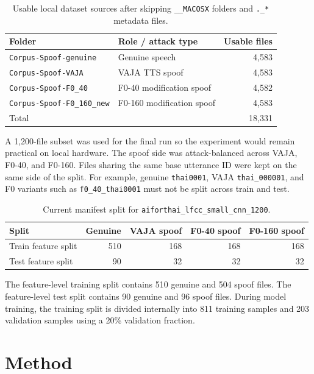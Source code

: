 \documentclass[11pt,a4paper]{article}
\begin{document}
\begin{table}[h]
\centering
\caption{Usable local dataset sources after skipping \texttt{\_\_MACOSX} folders and \texttt{.\_*} metadata files.}
\label{tab:dataset-sources}
\begin{tabular}{llr}
\toprule
Folder & Role / attack type & Usable files \\
\midrule
\texttt{Corpus-Spoof-genuine} & Genuine speech & 4,583 \\
\texttt{Corpus-Spoof-VAJA} & VAJA TTS spoof & 4,583 \\
\texttt{Corpus-Spoof-F0\_40} & F0-40 modification spoof & 4,582 \\
\texttt{Corpus-Spoof-F0\_160\_new} & F0-160 modification spoof & 4,583 \\
\midrule
Total & & 18,331 \\
\bottomrule
\end{tabular}
\end{table}

A 1,200-file subset was used for the final run so the experiment would remain practical on local hardware. The spoof side was attack-balanced across VAJA, F0-40, and F0-160. Files sharing the same base utterance ID were kept on the same side of the split. For example, genuine \texttt{thai0001}, VAJA \texttt{thai\_000001}, and F0 variants such as \texttt{f0\_40\_thai0001} must not be split across train and test.

\begin{table}[h]
\centering
\caption{Current manifest split for \texttt{aiforthai\_lfcc\_small\_cnn\_1200}.}
\label{tab:manifest-split}
\begin{tabular}{lrrrr}
\toprule
Split & Genuine & VAJA spoof & F0-40 spoof & F0-160 spoof \\
\midrule
Train feature split & 510 & 168 & 168 & 168 \\
Test feature split & 90 & 32 & 32 & 32 \\
\bottomrule
\end{tabular}
\end{table}

The feature-level training split contains 510 genuine and 504 spoof files. The feature-level test split contains 90 genuine and 96 spoof files. During model training, the training split is divided internally into 811 training samples and 203 validation samples using a 20\% validation fraction.

\section{Method}
\end{document}
